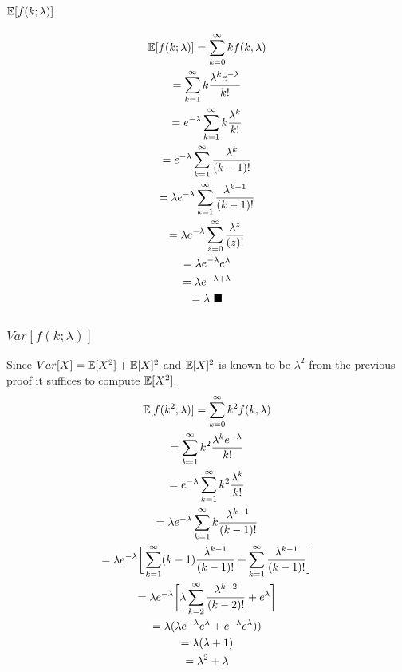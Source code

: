 \documentclass[11pt, oneside]{article}   	%
\begin{document}
\subsubsection{$\Bbb E[f(k; \lambda)]$}
\begin{gather*}
\Bbb E[f(k; \lambda)] = \sum_{k = 0}^{\infty} k f(k, \lambda)\\
= \sum_{k = 1}^{\infty} k \frac{\lambda^k e^{-\lambda}}{k!}\\
= e^{-\lambda} \sum_{k = 1}^{\infty} k \frac{\lambda^k}{k!}\\
= e^{-\lambda} \sum_{k = 1}^{\infty} \frac{\lambda^k}{(k - 1)!}\\
= \lambda e^{-\lambda} \sum_{k = 1}^{\infty} \frac{\lambda^{k - 1}}{(k - 1)!}\\
= \lambda e^{-\lambda} \sum_{z = 0}^{\infty} \frac{\lambda^{z}}{(z)!}\\
= \lambda e^{-\lambda} e^{\lambda}\\
= \lambda e^{-\lambda + \lambda}\\
= \lambda \text{ } \blacksquare
\end{gather*}

\subsubsection{$Var[f(k; \lambda)]$}
Since $Var[X] = \Bbb E[X^2] + \Bbb E[X]^2$ and $\Bbb E[X]^2$ is known to be $\lambda^2$ from the previous proof it suffices to compute $\Bbb E[X^2]$.
\begin{gather*}
\Bbb E[f(k^2; \lambda)] = \sum_{k = 0}^{\infty} k^2 f(k, \lambda)\\
= \sum_{k = 1}^{\infty} k^2 \frac{\lambda^k e^{-\lambda}}{k!}\\
= e^{-\lambda} \sum_{k = 1}^{\infty} k^2 \frac{\lambda^k}{k!}\\
= \lambda e^{-\lambda} \sum_{k = 1}^{\infty} k \frac{\lambda^{k - 1}}{(k - 1)!}\\
= \lambda e^{-\lambda} \bigg[ \sum_{k = 1}^{\infty} (k - 1) \frac{\lambda^{k - 1}}{(k - 1)!} + \sum_{k = 1}^{\infty} \frac{\lambda^{k - 1}}{(k - 1)!} \bigg]\\
= \lambda e^{-\lambda} \bigg[ \lambda \sum_{k = 2}^{\infty} \frac{\lambda^{k - 2}}{(k - 2)!} + e^\lambda \bigg]\\
= \lambda (\lambda e^{-\lambda} e^\lambda + e^{-\lambda} e^\lambda))\\
= \lambda(\lambda + 1)\\
= \lambda^2 + \lambda
\end{gather*}
\end{document}
